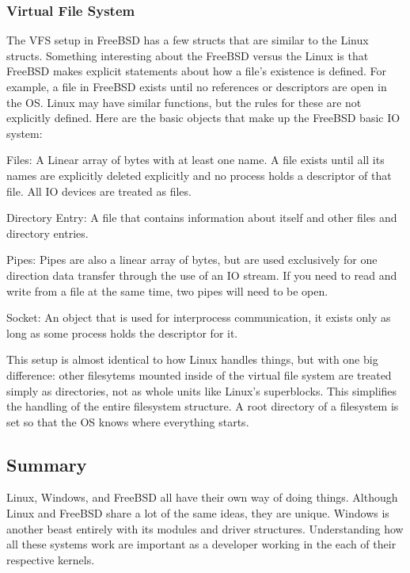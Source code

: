 \documentclass[10pt,letterpaper,onecolumn,draftclsnofoot]{IEEEtran}
\begin{document}
\subsubsection{Virtual File System}
The VFS setup in FreeBSD has a few structs that are similar to the Linux structs.
Something interesting about the FreeBSD versus the Linux is that FreeBSD
makes explicit statements about how a file's existence is defined. For example,
a file in FreeBSD exists until no references or descriptors are open in the OS.
Linux may have similar functions, but the rules for these are not explicitly
defined. Here are the basic objects that make up the FreeBSD basic IO system:
\cite{freebsd2016}
\begin{description}
	\item Files: A Linear array of bytes with at least one name. A file exists
	until all its names are explicitly deleted explicitly and no process holds a
	descriptor of that file. All IO devices are treated as files.
	\item Directory Entry: A file that contains information about itself and
	other files and directory entries.
	\item Pipes: Pipes are also a linear array of bytes, but are used exclusively
	for one direction data transfer through the use of an IO stream. If you need
	to read and write from a file at the same time, two pipes will need to be open.
	\item Socket: An object that is used for interprocess communication, it exists
	only as long as some process holds the descriptor for it.
\end{description}

This setup is almost identical to how Linux handles things, but with one big
difference: other filesytems mounted inside of the virtual file system are treated simply
as directories, not as whole units like Linux's superblocks. This simplifies
the handling of the entire filesystem structure. A root directory of a filesystem
is set so that the OS knows where everything starts.

\subsection{Summary}
Linux, Windows, and FreeBSD all have their own way of doing things. Although Linux
and FreeBSD share a lot of the same ideas, they are unique. Windows is another beast
entirely with its modules and driver structures. Understanding how all these systems
work are important as a developer working in the each of their respective kernels.
\end{document}
